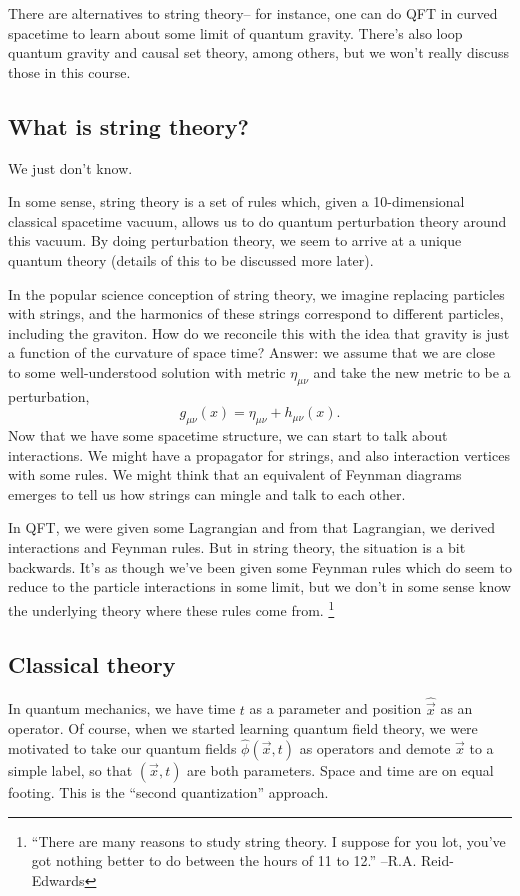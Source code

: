There are alternatives to string theory-- for instance, one can do QFT in curved spacetime to learn about some limit of quantum gravity. There's also loop quantum gravity and causal set theory, among others, but we won't really discuss those in this course.

\subsection*{What is string theory?} We just don't know.

In some sense, string theory is a set of rules which, given a 10-dimensional classical spacetime vacuum, allows us to do quantum perturbation theory around this vacuum. By doing perturbation theory, we seem to arrive at a unique quantum theory (details of this to be discussed more later).

In the popular science conception of string theory, we imagine replacing particles with strings, and the harmonics of these strings correspond to different particles, including the graviton. How do we reconcile this with the idea that gravity is just a function of the curvature of space time? Answer: we assume that we are close to some well-understood solution with metric $\eta_{\mu\nu}$ and take the new metric to be a perturbation,
\begin{equation*}
    g_{\mu\nu}(x)=\eta_{\mu\nu}+h_{\mu\nu}(x).
\end{equation*}
Now that we have some spacetime structure, we can start to talk about interactions. We might have a propagator for strings, and also interaction vertices with some rules. We might think that an equivalent of Feynman diagrams emerges to tell us how strings can mingle and talk to each other.

In QFT, we were given some Lagrangian and from that Lagrangian, we derived interactions and Feynman rules. But in string theory, the situation is a bit backwards. It's as though we've been given some Feynman rules which do seem to reduce to the particle interactions in some limit, but we don't in some sense know the underlying theory where these rules come from.%
    \footnote{``There are many reasons to study string theory. I suppose for you lot, you've got nothing better to do between the hours of 11 to 12.'' --R.A. Reid-Edwards}

\subsection*{Classical theory} In quantum mechanics, we have time $t$ as a parameter and position $\hat{\vec x}$ as an operator. Of course, when we started learning quantum field theory, we were motivated to take our quantum fields $\hat \phi(\vec x,t)$ as operators and demote $\vec x$ to a simple label, so that $(\vec x,t)$ are both parameters. Space and time are on equal footing. This is the ``second quantization'' approach.

